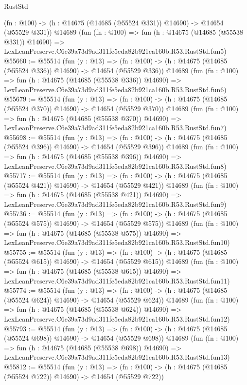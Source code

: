 \begin{lexlean}{RustStd}
\begin{coremodule}
    (fn : @100) -> (h : @14675 (@14685 (@55524 @331)) @14690) -> @14654 (@55529 @331))
    @14689
    (fun (fn : @100) =>
    fun (h : @14675 (@14685 (@55538 @331)) @14690) =>
    LexLeanPreserve.C6e39a73d9ad311fe5eda82b921ca160b.R53.RustStd.fun5)
@55660 := @55514
    (fun (y : @13) =>
    (fn : @100) -> (h : @14675 (@14685 (@55524 @336)) @14690) -> @14654 (@55529 @336))
    @14689
    (fun (fn : @100) =>
    fun (h : @14675 (@14685 (@55538 @336)) @14690) =>
    LexLeanPreserve.C6e39a73d9ad311fe5eda82b921ca160b.R53.RustStd.fun6)
@55679 := @55514
    (fun (y : @13) =>
    (fn : @100) -> (h : @14675 (@14685 (@55524 @370)) @14690) -> @14654 (@55529 @370))
    @14689
    (fun (fn : @100) =>
    fun (h : @14675 (@14685 (@55538 @370)) @14690) =>
    LexLeanPreserve.C6e39a73d9ad311fe5eda82b921ca160b.R53.RustStd.fun7)
@55698 := @55514
    (fun (y : @13) =>
    (fn : @100) -> (h : @14675 (@14685 (@55524 @396)) @14690) -> @14654 (@55529 @396))
    @14689
    (fun (fn : @100) =>
    fun (h : @14675 (@14685 (@55538 @396)) @14690) =>
    LexLeanPreserve.C6e39a73d9ad311fe5eda82b921ca160b.R53.RustStd.fun8)
@55717 := @55514
    (fun (y : @13) =>
    (fn : @100) -> (h : @14675 (@14685 (@55524 @421)) @14690) -> @14654 (@55529 @421))
    @14689
    (fun (fn : @100) =>
    fun (h : @14675 (@14685 (@55538 @421)) @14690) =>
    LexLeanPreserve.C6e39a73d9ad311fe5eda82b921ca160b.R53.RustStd.fun9)
@55736 := @55514
    (fun (y : @13) =>
    (fn : @100) -> (h : @14675 (@14685 (@55524 @575)) @14690) -> @14654 (@55529 @575))
    @14689
    (fun (fn : @100) =>
    fun (h : @14675 (@14685 (@55538 @575)) @14690) =>
    LexLeanPreserve.C6e39a73d9ad311fe5eda82b921ca160b.R53.RustStd.fun10)
@55755 := @55514
    (fun (y : @13) =>
    (fn : @100) -> (h : @14675 (@14685 (@55524 @615)) @14690) -> @14654 (@55529 @615))
    @14689
    (fun (fn : @100) =>
    fun (h : @14675 (@14685 (@55538 @615)) @14690) =>
    LexLeanPreserve.C6e39a73d9ad311fe5eda82b921ca160b.R53.RustStd.fun11)
@55774 := @55514
    (fun (y : @13) =>
    (fn : @100) -> (h : @14675 (@14685 (@55524 @624)) @14690) -> @14654 (@55529 @624))
    @14689
    (fun (fn : @100) =>
    fun (h : @14675 (@14685 (@55538 @624)) @14690) =>
    LexLeanPreserve.C6e39a73d9ad311fe5eda82b921ca160b.R53.RustStd.fun12)
@55793 := @55514
    (fun (y : @13) =>
    (fn : @100) -> (h : @14675 (@14685 (@55524 @698)) @14690) -> @14654 (@55529 @698))
    @14689
    (fun (fn : @100) =>
    fun (h : @14675 (@14685 (@55538 @698)) @14690) =>
    LexLeanPreserve.C6e39a73d9ad311fe5eda82b921ca160b.R53.RustStd.fun13)
@55812 := @55514
    (fun (y : @13) =>
    (fn : @100) -> (h : @14675 (@14685 (@55524 @722)) @14690) -> @14654 (@55529 @722))

\end{coremodule}
\end{lexlean}
